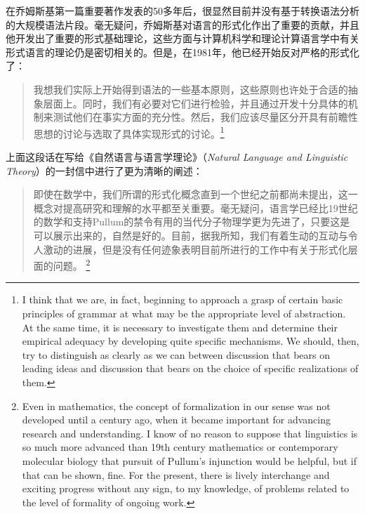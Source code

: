 在乔姆斯基第一篇重要著作发表的50多年后，很显然目前并没有基于转换语法分析的大规模语法片段。毫无疑问，乔姆斯基对语言的形式化作出了重要的贡献，并且他开发出了重要的形式基础理论，这些方面与计算机科学和理论计算语言学中有关形式语言的理论仍是密切相关的\citep{Chomsky59a-u}。但是，在1981年，他已经开始反对严格的形式化了：
\begin{quotation}
我想我们实际上开始得到语法的一些基本原则，这些原则也许处于合适的抽象层面上。同时，我们有必要对它们进行检验，并且通过开发十分具体的机制来测试他们在事实方面的充分性。然后，我们应该尽量区分开具有前瞻性思想的讨论与选取了具体实现形式的讨论。\citep*[--3]{Chomsky81a}\footnote{%
I think that we are, in fact, beginning to approach a grasp of certain 
basic principles of grammar at what may be the appropriate level of abstraction. At the same time, 
it is necessary to investigate them and determine their empirical adequacy by developing quite specific mechanisms.
We should, then, try to distinguish as clearly as we can between discussion that bears on leading ideas and
discussion that bears on the choice of specific realizations of them.}
\end{quotation}
上面这段话在写给《自然语言与语言学理论》（\emph{Natural Language and Linguistic Theory}）的一封信中进行了更为清晰的阐述：
\begin{quotation}
即使在数学中，我们所谓的形式化概念直到一个世纪之前都尚未提出，这一概念对提高研究和理解的水平都至关重要。毫无疑问，语言学已经比19世纪的数学和支持Pullum的禁令有用的当代分子物理学更为先进了，只要这是可以展示出来的，自然是好的。目前，据我所知，我们有着生动的互动与令人激动的进展，但是没有任何迹象表明目前所进行的工作中有关于形式化层面的问题。 \citep[]{Chomsky90a}\footnote{%
Even in mathematics, the concept of formalization in our sense was not
developed until a century ago, when it became important for advancing research
and understanding. I know of no reason to suppose that linguistics is so much
more advanced than 19th century mathematics or contemporary molecular
biology that pursuit of Pullum's injunction would be helpful, but if that can be
shown, fine. For the present, there is lively interchange and exciting progress
without any sign, to my knowledge, of problems related to the level of formality
of ongoing work. }
\end{quotation}
